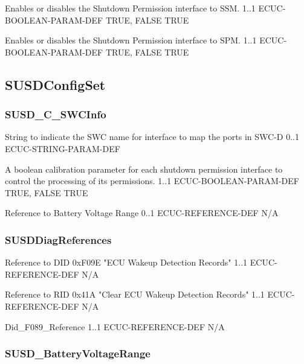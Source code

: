 {Enables or disables the Shutdown Permission interface to SSM.}
{1..1}
{ECUC-BOOLEAN-PARAM-DEF}
{TRUE, FALSE}
{TRUE}

{Enables or disables the Shutdown Permission interface to SPM.}
{1..1}
{ECUC-BOOLEAN-PARAM-DEF}
{TRUE, FALSE}
{TRUE}

\subsection{SUSDConfigSet}

\subsubsection{SUSD_C_SWCInfo}

{String to indicate the SWC name for interface to map the ports in SWC-D}
{0..1}
{ECUC-STRING-PARAM-DEF}
{}
{}

{
{A boolean calibration parameter for each shutdown permission interface to control the processing of its permissions.}
{1..1}
{ECUC-BOOLEAN-PARAM-DEF}
{TRUE, FALSE}
{TRUE}}
{ }

{
{Reference to Battery Voltage Range}
{0..1}
{ECUC-REFERENCE-DEF}
{N/A}
{}}
{}


\subsubsection{SUSDDiagReferences}
\label{sec:Dcmreference}
{
{Reference to DID 0xF09E "ECU Wakeup Detection Records"}
{1..1}
{ECUC-REFERENCE-DEF}
{N/A}
{}}
{}

{
{Reference to RID 0x41A "Clear ECU Wakeup Detection Records"}
{1..1}
{ECUC-REFERENCE-DEF}
{N/A}
{}}
{ }

{
{Did_F089_Reference}
{1..1}
{ECUC-REFERENCE-DEF}
{N/A}
{}}
{}

\subsubsection{SUSD_BatteryVoltageRange}

